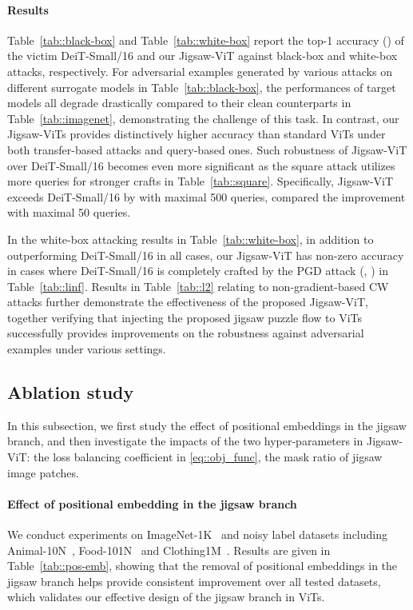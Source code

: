 \documentclass{article}
\begin{document}
\paragraph{Results} 
Table~\ref{tab::black-box} and Table~\ref{tab::white-box} report
the top-1 accuracy () of the victim DeiT-Small/16 and our Jigsaw-ViT against black-box and white-box attacks, respectively. 
For adversarial examples generated by various attacks on different surrogate models in Table~\ref{tab::black-box}, the performances of target models all degrade drastically compared to their clean counterparts in Table~\ref{tab::imagenet}, demonstrating the challenge of this task.
In contrast, our Jigsaw-ViTs provides distinctively higher accuracy than standard ViTs under both transfer-based attacks and query-based ones.
Such robustness of Jigsaw-ViT over DeiT-Small/16 becomes even more significant as the square attack utilizes more queries for stronger crafts in Table~\ref{tab::square}.
Specifically, Jigsaw-ViT exceeds DeiT-Small/16 by  with maximal 500 queries, compared the  improvement with maximal 50 queries.

In the white-box attacking results in Table~\ref{tab::white-box}, in addition to outperforming DeiT-Small/16 in all cases, our Jigsaw-ViT has non-zero accuracy in cases where DeiT-Small/16 is completely crafted by the PGD attack (, ) in Table~\ref{tab::linf}. 
Results in Table~\ref{tab::l2} relating to non-gradient-based CW attacks further demonstrate the effectiveness of the proposed Jigsaw-ViT, together verifying that injecting the proposed jigsaw puzzle flow to ViTs successfully provides improvements on the robustness against adversarial examples under various settings.

\subsection{Ablation study}
\label{sec::ablation}
In this subsection, we first study the effect of positional embeddings in the jigsaw branch, and then investigate the impacts of the two hyper-parameters in Jigsaw-ViT: the loss balancing coefficient  in \eqref{eq::obj_func}, the mask ratio  of jigsaw image patches. 

\paragraph{Effect of positional embedding in the jigsaw branch} 
We conduct experiments on ImageNet{-1K}~\cite{deng2009imagenet} and noisy label datasets including Animal-10N~\cite{song2019selfie}, Food-101N~\cite{lee2018cleannet} and Clothing1M~\cite{xiao2015learning}. 
Results are given in Table~\ref{tab::pos-emb}, showing that the removal of positional embeddings in the jigsaw branch helps provide consistent improvement over all tested datasets, which validates our effective design of the jigsaw branch in ViTs.
\end{document}
